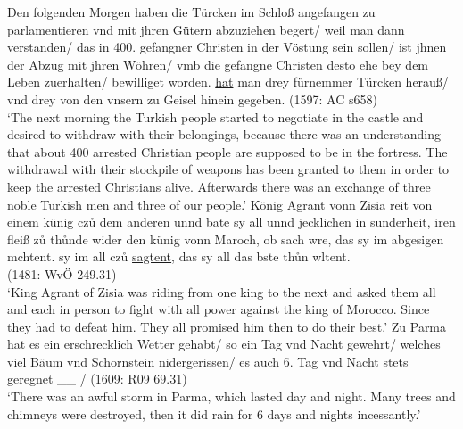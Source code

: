 \documentclass[output=paper,colorlinks,citecolor=brown]{langscibook}
\begin{document}
\largerpage
\eal \label{darauf}
\ex Den folgenden Morgen haben die Türcken im Schloß angefangen zu parlamentieren vnd mit jhren Gütern abzuziehen begert/ weil man dann verstanden/ das in 400. gefangner Christen in der Vöstung sein sollen/ ist jhnen der Abzug mit jhren Wöhren/ vmb die gefangne Christen desto ehe bey dem Leben zuerhalten/ bewilliget worden.  \underline{hat} man drey fürnemmer Türcken herauß/ vnd drey von den vnsern zu Geisel hinein gegeben.  \hfill (1597: AC s658) \\
`The next morning the Turkish people started to negotiate in the castle and desired to withdraw with their belongings, because there was an understanding that about 400 arrested Christian people are supposed to be in the fortress. The withdrawal with their stockpile of weapons has been granted to them in order to keep the arrested Christians alive. Afterwards there was an exchange of three noble Turkish men and three of our people.'
\ex König Agrant vonn Zisia reit von einem künig cz\r{u} dem anderen unnd bate sy all unnd jecklichen in sunderheit, iren fleiß z\r{u} th\r{u}nde wider den künig vonn Maroch, ob sach w\oldae{}re, das sy im abgesigen m\oldoe{}chtent.  sy im all cz\r{u} \underline{sagtent}, das sy all das b\oldoe{}ste th\r{u}n w\oldoe{}ltent.\\  \hfill (1481: WvÖ 249.31)\\
`King Agrant of Zisia was riding from one king to the next and asked them all and each in person to fight with all power against the king of Morocco. Since they had to defeat him. They all promised him then to do their best.'
\ex Zu Parma hat es ein erschrecklich Wetter gehabt/ so ein Tag vnd Nacht gewehrt/  welches viel Bäum vnd Schornstein nidergerissen/  es auch 6. Tag vnd Nacht stets geregnet \_\_ / \hfill (1609: R09 69.31) \\
`There was an awful storm in Parma, which lasted day and night. Many trees and chimneys were destroyed, then it did rain for 6 days and nights incessantly.'
\zl
\end{document}
